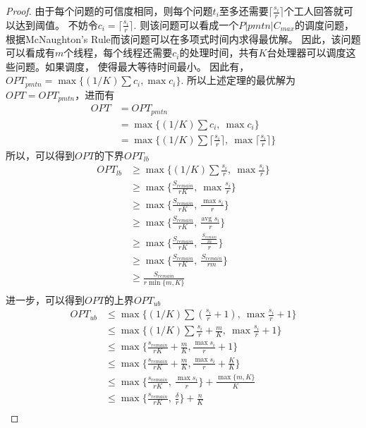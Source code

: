 \documentclass[UTF8]{ctexart}
\begin{document}
\begin{enumerate}[(1)]
	\begin{proof}
	由于每个问题的可信度相同，则每个问题$t_i$至多还需要$\lceil \frac{s_i}{r} \rceil$个工人回答就可以达到阈值。
	不妨令$c_i = \lceil \frac{s_i}{r} \rceil$.
	则该问题可以看成一个$P|pmtn|C_{max}$的调度问题，根据McNaughton's Rule而该问题可以在多项式时间内求得最优解。
	因此，该问题可以看成有$m$个线程，每个线程还需要$c_i$的处理时间，共有$K$台处理器可以调度这些问题。如果调度，
	使得最大等待时间最小。
	因此有，$OPT_{pmtn} = \max \{ (1/K)\sum{c_i}, \max{c_i} \}$.
	所以上述定理的最优解为$OPT = OPT_{pmtn}$，进而有
	\begin{align*}
		OPT &= OPT_{pmtn} \\
			&= \max \{ (1/K)\sum{c_i},\ \max{c_i} \} \\
			&= \max \{ (1/K)\sum{\lceil \frac{s_i}{r} \rceil},\  \max{\lceil \frac{s_i}{r} \rceil} \}
	\end{align*}
	所以，可以得到$OPT$的下界$OPT_{lb}$
	\begin{align*}
		OPT_{lb} &\ge \max \{ (1/K)\sum{\frac{s_i}{r}},\ \max{\frac{s_i}{r}} \} \\
				 &\ge \max \{ \frac{S_{remain}}{rK},\ \max{\frac{s_i}{r}} \} \\
				 &\ge \max \{ \frac{S_{remain}}{rK},\ \frac{\max{s_i}}{r} \} \\
				 &\ge \max \{ \frac{S_{remain}}{rK},\ \frac{\text{avg }{s_i}}{r} \} \\
				 &\ge \max \{ \frac{S_{remain}}{rK},\ \frac{\frac{S_{remain}}{m}}{r} \} \\
				 &\ge \max \{ \frac{S_{remain}}{rK},\ \frac{S_{remain}}{rm} \} \\
				 &\ge \frac{S_{remain}}{r\min\{m,K\}} \\
	\end{align*}
	进一步，可以得到$OPT$的上界$OPT_{ub}$
	\begin{align*}
		OPT_{ub} &\le \max \{ (1/K)\sum{(\frac{s_i}{r}+1)},\ \max{\frac{s_i}{r}+1} \} \\
				 &\le \max \{ (1/K)\sum{\frac{s_i}{r}}+\frac{m}{K},\ \max{\frac{s_i}{r}}+1 \} \\
				 &\le \max \{ \frac{s_{remain}}{rK}+\frac{m}{K},\frac{\max{s_i}}{r}+1  \} \\
				 &\le \max \{ \frac{s_{remain}}{rK}+\frac{m}{K},\frac{\max{s_i}}{r}+\frac{K}{K}  \} \\
				 &\le \max \{ \frac{s_{remain}}{rK},\ \frac{\max{s_i}}{r} \} + \frac{\max\{m,K\}}{K} \\
				 &\le \max \{ \frac{s_{remain}}{rK},\ \frac{\delta}{r} \} + \frac{n}{K} \\
	\end{align*}
	\end{proof}
	

\end{enumerate}
\end{document}
